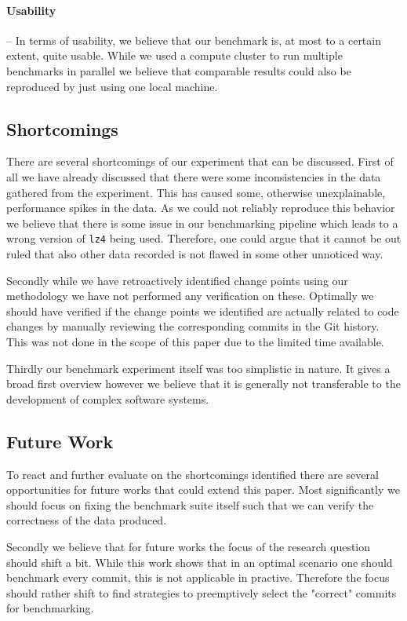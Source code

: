 \documentclass[	runningheads,
				a4paper]{llncs}
\begin{document}
\paragraph{Usability} -- In terms of usability, we believe that our benchmark is, at most to a certain extent, quite usable. While we used a compute cluster to run multiple benchmarks in parallel we believe that comparable results could also be reproduced by just using one local machine.

	\subsection{Shortcomings}
	\label{ssec:refl_shortcomings}
	There are several shortcomings of our experiment that can be discussed. First of all we have already discussed that there were some inconsistencies in the data gathered from the experiment. This has caused some, otherwise unexplainable, performance spikes in the data. As we could not reliably reproduce this behavior we believe that there is some issue in our benchmarking pipeline which leads to a wrong version of \texttt{lz4} being used. Therefore, one could argue that it cannot be out ruled that also other data recorded is not flawed in some other unnoticed way.

	Secondly while we have retroactively identified change points using our methodology we have not performed any verification on these. Optimally we should have verified if the change points we identified are actually related to code changes by manually reviewing the corresponding commits in the Git history. This was not done in the scope of this paper due to the limited time available.

	Thirdly our benchmark experiment itself was too simplistic in nature. It gives a broad first overview however we believe that it is generally not transferable to the development of complex software systems.

	\subsection{Future Work}

	To react and further evaluate on the shortcomings identified there are several opportunities for future works that could extend this paper. Most significantly we should focus on fixing the benchmark suite itself such that we can verify the correctness of the data produced.

	Secondly we believe that for future works the focus of the research question should shift a bit. While this work shows that in an optimal scenario one should benchmark every commit, this is not applicable in practive. Therefore the focus should rather shift to find strategies to preemptively select the "correct" commits for benchmarking.
\end{document}
